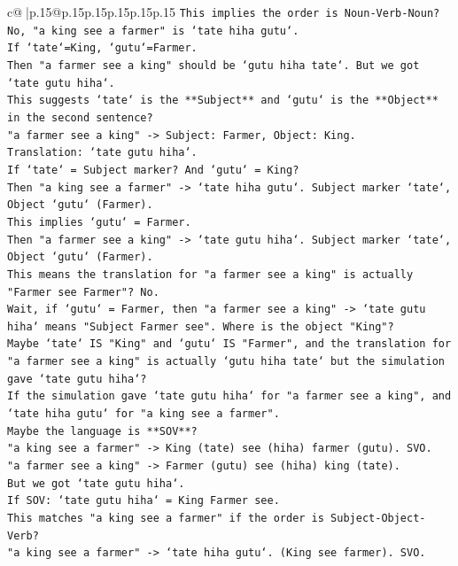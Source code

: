 \documentclass{article}
\begin{document}
{\begin{supertabular}{c@{$\;$}|p{.15\linewidth}@{}p{.15\linewidth}p{.15\linewidth}p{.15\linewidth}p{.15\linewidth}p{.15\linewidth}}
{{{\texttt{This implies the order is Noun{-}Verb{-}Noun? No, "a king see a farmer" is `tate hiha gutu`.} \\
\texttt{If `tate`=King, `gutu`=Farmer.} \\
\texttt{Then "a farmer see a king" should be `gutu hiha tate`. But we got `tate gutu hiha`.} \\
\texttt{This suggests `tate` is the **Subject** and `gutu` is the **Object** in the second sentence?} \\
\texttt{"a farmer see a king" {-}> Subject: Farmer, Object: King.} \\
\texttt{Translation: `tate gutu hiha`.} \\
\texttt{If `tate` = Subject marker? And `gutu` = King?} \\
\texttt{Then "a king see a farmer" {-}> `tate hiha gutu`. Subject marker `tate`, Object `gutu` (Farmer).} \\
\texttt{This implies `gutu` = Farmer.} \\
\texttt{Then "a farmer see a king" {-}> `tate gutu hiha`. Subject marker `tate`, Object `gutu` (Farmer).} \\
\texttt{This means the translation for "a farmer see a king" is actually "Farmer see Farmer"? No.} \\
\texttt{Wait, if `gutu` = Farmer, then "a farmer see a king" {-}> `tate gutu hiha` means "Subject Farmer see". Where is the object "King"?} \\
\texttt{Maybe `tate` IS "King" and `gutu` IS "Farmer", and the translation for "a farmer see a king" is actually `gutu hiha tate` but the simulation gave `tate gutu hiha`?} \\
\texttt{If the simulation gave `tate gutu hiha` for "a farmer see a king", and `tate hiha gutu` for "a king see a farmer".} \\
\texttt{Maybe the language is **SOV**?} \\
\texttt{"a king see a farmer" {-}> King (tate) see (hiha) farmer (gutu). SVO.} \\
\texttt{"a farmer see a king" {-}> Farmer (gutu) see (hiha) king (tate).} \\
\texttt{But we got `tate gutu hiha`.} \\
\texttt{If SOV: `tate gutu hiha` = King Farmer see.} \\
\texttt{This matches "a king see a farmer" if the order is Subject{-}Object{-}Verb?} \\
\texttt{"a king see a farmer" {-}> `tate hiha gutu`. (King see farmer). SVO.} \\
}}}
\end{supertabular}}
\end{document}
